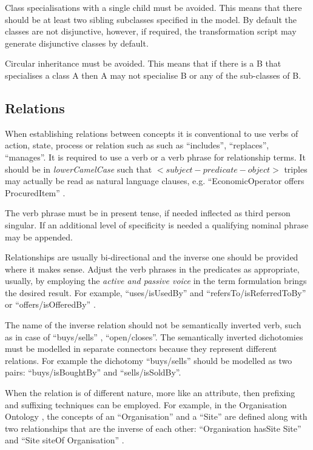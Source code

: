 	Class specialisations with a single child must be avoided. This means that there should be at least two sibling subclasses specified in the model. By default the classes are not disjunctive, however, if required, the transformation script may generate disjunctive classes by default.
	
	Circular inheritance must be avoided. This means that if there is a B that specialises a class A then A may not specialise B or any of the sub-classes of B. 
	
	\subsection{Relations}
	\label{sec:relations}
	
	When establishing relations between concepts it is conventional to use verbs of action, state, process or relation such as such as ``includes'', ``replaces'', ``manages''. It is required to use a verb or a verb phrase for relationship terms. It should be in \textit{lowerCamelCase} such that $<subject-predicate-object>$ triples may actually be read as natural language clauses, e.g. ``EconomicOperator offers ProcuredItem'' \cite{d2.01-2017}.
	
	The verb phrase must be in present tense, if needed inflected as third person singular. If an additional level of specificity is needed a qualifying nominal phrase may be appended. 
	
	Relationships are usually bi-directional and the inverse one should be provided where it makes sense. Adjust the verb phrases in the predicates as appropriate, usually, by employing the \textit{active and passive voice} in the term formulation brings the desired result. For example, ``uses/isUsedBy'' and ``refersTo/isReferredToBy'' or ``offers/isOfferedBy'' \cite{d2.01-2017}.
	
	The name of the inverse relation should not be semantically inverted verb, such as in case of ``buys/sells'' , ``open/closes''. The semantically inverted dichotomies must be modelled in separate connectors because they represent different relations. For example the dichotomy ``buys/sells'' should be modelled as two pairs: ``buys/isBoughtBy'' and ``sells/isSoldBy''.
	
	When the relation is of different nature, more like an attribute, then prefixing and suffixing techniques can be employed. For example, in the Organisation Ontology \cite{org-ontology}, the concepts of an ``Organisation'' and a ``Site'' are defined along with two relationships that are the inverse of each other: ``Organisation hasSite Site'' and ``Site siteOf Organisation'' \citep{d3.1-2015}.
	
